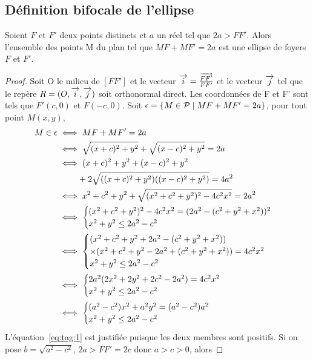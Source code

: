 \subsection{Définition bifocale de l'ellipse}
\begin{prop}
  \label{prop:bifellipse}
  Soient $F$ et $F'$ deux points distincts et $a$ un réel tel que $2a>FF'$. Alors l'ensemble des points M du plan tel que $MF+MF'=2a$ est une ellipse de foyers $F$ et $F'$.
\end{prop}
\begin{proof}
  Soit O le milieu de $[FF']$ et le vecteur $\overrightarrow{i}=\frac{\overrightarrow{FF'}}{FF'}$ et le vecteur $\overrightarrow{j}$ tel que le repère $R=(O,\overrightarrow{i},\overrightarrow{j})$ soit orthonormal direct. Les coordonnées de F et F' sont tels que $F'(c,0)$ et $F(-c,0)$. Soit $\epsilon=\left\{M \in \mathcal{P}\mathrel{}\middle|\mathrel{}MF+MF'=2a\right\}$, pour tout point $M(x,y)$,
  \begin{align}
    M \in \epsilon & \iff MF+MF'=2a \\
    & \iff \sqrt{(x+c)^2+y^2} + \sqrt{(x-c)^2+y^2}=2a \\
    & \iff (x+c)^2+y^2+(x-c)^2+y^2 \notag \\
    & \phantom{\iff} + 2\sqrt{((x+c)^2+y^2)((x-c)^2+y^2)}=4a^2 \label{eq:tag:1}\\
    & \iff x^2+c^2+y^2+\sqrt{(x^2+c^2+y^2)^2-4c^2x^2}=2a^2\\
    & \iff \begin{cases} (x^2+c^2+y^2)^2-4c^2x^2 = (2a^2-(c^2+y^2+x^2))^2 \\ x^2+y^2 \leq 2a^2 -c^2\\\end{cases}\\
    & \iff \begin{cases} (x^2+c^2+y^2 + 2a^2-(c^2+y^2+x^2)) \\ \times (x^2+c^2+y^2 - 2a^2+(c^2+y^2+x^2))=4c^2x^2  \\ x^2+y^2 \leq 2a^2 -c^2\end{cases}\\
    & \iff \begin{cases} 2a^2(2x^2+2y^2+2c^2-2a^2)=4c^2x^2  \\ x^2+y^2 \leq 2a^2 -c^2\end{cases}\\
    & \iff \begin{cases} (a^2-c^2)x^2 +a^2y^2=(a^2-c^2)a^2  \\ x^2+y^2 \leq 2a^2 -c^2\end{cases}
  \end{align}
L'équation~\eqref{eq:tag:1} est justifiée puisque les deux membres sont positifs. Si on  pose $b=\sqrt{a^2-c^2}$, $2a>FF'=2c$ donc $a>c>0$, alors

\end{proof}
